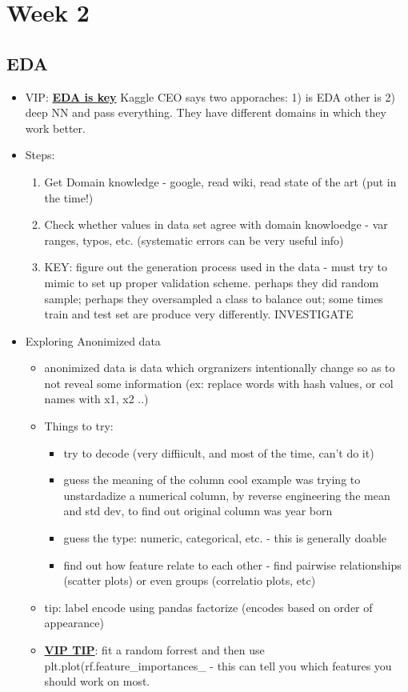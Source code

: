 \documentclass[a4paper]{report}
\begin{document}
\chapter{Week 2}
\section{EDA}
\begin{itemize}
  \item VIP: \underline{\bf EDA is key}
    \subitem Kaggle CEO says two apporaches: 1) is EDA other is 2) deep NN and pass everything. They have different domains in which they work better.
  \item Steps:
    \begin{enumerate}
      \item Get Domain knowledge - google, read wiki, read state of the art (put in the time!)
      \item Check whether values in data set agree with domain knowloedge - var ranges, typos, etc. (systematic errors can be very useful info)
      \item KEY: figure out the generation process used in the data - must try to mimic to set up proper validation scheme.
	\subitem perhaps they did random sample; perhaps they oversampled a class to balance out; some times train and test set are produce very differently. INVESTIGATE
    \end{enumerate}
  \item Exploring Anonimized data
    \begin{itemize}
      \item anonimized data is data which orgranizers intentionally change so as to not reveal some information  (ex: replace words with hash values, or col names with x1, x2 ..)
      \item Things to try:
	\begin{itemize}
	  \item try to decode (very diffiicult, and most of the time, can't do it)
	  \item guess the meaning of the column 
	    \subitem cool example was trying to unstardadize a numerical column, by reverse engineering the mean and std dev, to find out original column was year born
	  \item guess the type: numeric, categorical, etc.   - this is generally doable
	  \item find out how feature relate to each other - find pairwise relationships (scatter plots) or even groups (correlatio plots, etc)
	\end{itemize}
      \item tip: label encode using pandas factorize (encodes based on order of appearance)
      \item \underline{\bf VIP TIP}: fit a random forrest and then use {\color{brown} plt.plot(rf.feature\_importances\_} - this can tell you which features you should work on most.
    \end{itemize}
\end{itemize}	
\end{document}

